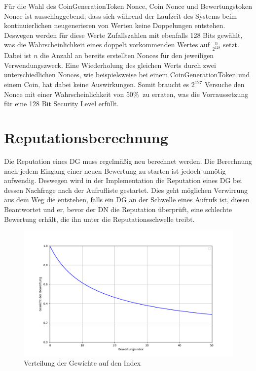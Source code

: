 \documentclass[
	fontsize=11pt,
	headings=small,
	parskip=half,           %
	bibliography=totoc,
	numbers=noenddot,       %
	open=any,               %
]{scrreprt}
\begin{document}
Für die Wahl des CoinGenerationToken Nonce, Coin Nonce und Bewertungstoken Nonce ist ausschlaggebend, dass sich während der Laufzeit des Systems beim kontinuierlichen neugenerieren von Werten keine Doppelungen entstehen. Deswegen werden für diese Werte Zufallszahlen mit ebenfalls 128 Bits gewählt, was die Wahrscheinlichkeit eines doppelt vorkommenden Wertes auf $\frac{n}{2^{128}}$ setzt. Dabei ist $n$ die Anzahl an bereits erstellten Nonces für den jeweiligen Verwendungszweck. Eine Wiederholung des gleichen Werts durch zwei unterschiedlichen Nonces, wie beispielsweise bei einem CoinGenerationToken und einem Coin, hat dabei keine Auswirkungen. Somit braucht es $2^{127}$ Versuche den Nonce mit einer Wahrscheinlichkeit von $50\%\ $ zu erraten, was die Vorraussetzung für eine 128 Bit Security Level erfüllt.

\section{Reputationsberechnung}
Die Reputation eines DG muss regelmäßig neu berechnet werden. Die Berechnung nach jedem Eingang einer neuen Bewertung zu starten ist jedoch unnötig aufwendig. Deswegen wird in der Implementation die Reputation eines DG bei dessen Nachfrage nach der Aufrufliste gestartet. Dies geht möglichen Verwirrung aus dem Weg die entstehen, falls ein DG an der Schwelle eines Aufrufs ist, diesen Beantwortet und er, bevor der DN die Reputation überprüft, eine schlechte Bewertung erhält, die ihn unter die Reputationsschwelle treibt.

\begin{figure}[h]
    \centering
    \caption{Verteilung der Gewichte auf den Index}
    \label{fig:reputationWeights}
    \includegraphics[width=0.8\linewidth]{ReputationWeights.png}
\end{figure}
\end{document}
